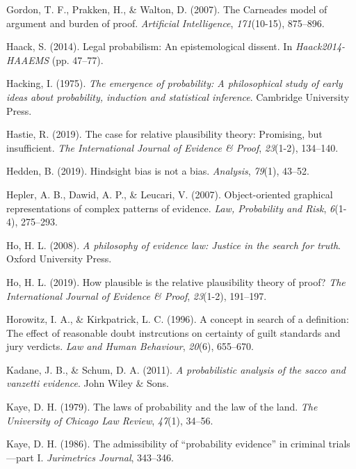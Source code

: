 \documentclass[11pt,dvipsnames,enabledeprecatedfontcommands]{scrartcl}
\begin{document}
\hypertarget{ref-gordon2007}{}
Gordon, T. F., Prakken, H., \& Walton, D. (2007). The Carneades model of
argument and burden of proof. \emph{Artificial Intelligence},
\emph{171}(10-15), 875--896.

\hypertarget{ref-haack2011legal}{}
Haack, S. (2014). Legal probabilism: An epistemological dissent. In
\emph{Haack2014-HAAEMS} (pp. 47--77).

\hypertarget{ref-Hacking1984}{}
Hacking, I. (1975). \emph{The emergence of probability: A philosophical
study of early ideas about probability, induction and statistical
inference}. Cambridge University Press.

\hypertarget{ref-hastie2019CaseRelativePlausibilitya}{}
Hastie, R. (2019). The case for relative plausibility theory: Promising,
but insufficient. \emph{The International Journal of Evidence \& Proof},
\emph{23}(1-2), 134--140.

\hypertarget{ref-hedden2019}{}
Hedden, B. (2019). Hindsight bias is not a bias. \emph{Analysis},
\emph{79}(1), 43--52.

\hypertarget{ref-hepler2007ObjectorientedGraphicalRepresentations}{}
Hepler, A. B., Dawid, A. P., \& Leucari, V. (2007). Object-oriented
graphical representations of complex patterns of evidence. \emph{Law,
Probability and Risk}, \emph{6}(1-4), 275--293.

\hypertarget{ref-ho2008philosophy}{}
Ho, H. L. (2008). \emph{A philosophy of evidence law: Justice in the
search for truth}. Oxford University Press.

\hypertarget{ref-lai2019HowPlausibleRelative}{}
Ho, H. L. (2019). How plausible is the relative plausibility theory of
proof? \emph{The International Journal of Evidence \& Proof},
\emph{23}(1-2), 191--197.

\hypertarget{ref-Horowitz1996}{}
Horowitz, I. A., \& Kirkpatrick, L. C. (1996). A concept in search of a
definition: The effect of reasonable doubt instrcutions on certainty of
guilt standards and jury verdicts. \emph{Law and Human Behaviour},
\emph{20}(6), 655--670.

\hypertarget{ref-kadane2011probabilistic}{}
Kadane, J. B., \& Schum, D. A. (2011). \emph{A probabilistic analysis of
the sacco and vanzetti evidence}. John Wiley \& Sons.

\hypertarget{ref-kaye79}{}
Kaye, D. H. (1979). The laws of probability and the law of the land.
\emph{The University of Chicago Law Review}, \emph{47}(1), 34--56.

\hypertarget{ref-kaye1986admissibility}{}
Kaye, D. H. (1986). The admissibility of ``probability evidence'' in
criminal trials---part I. \emph{Jurimetrics Journal}, 343--346.
\end{document}
